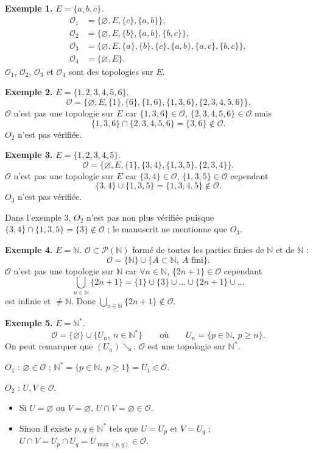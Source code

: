 \documentclass[11pt,a4paper]{article}
\newcommand{\N}{\mathbb{N}}
\newcommand{\Pp}{\mathscr{P}}
\newcommand{\Oo}{\mathscr{O}}
\begin{document}
\textbf{\color{bleu}Exemple 1.} $E=\{a,b,c\}$.
\begin{align*}
  \Oo_1&=\bigl\{\varnothing,E,\{c\},\{a,b\}\bigr\},\\
  \Oo_2&=\bigl\{\varnothing,E,\{b\},\{a,b\},\{b,c\}\bigr\},\\
  \Oo_3&=\bigl\{\varnothing,E,\{a\},\{b\},\{c\},\{a,b\},\{a,c\},\{b,c\}\bigr\},\\
  \Oo_4&=\bigl\{\varnothing,E\bigr\}.
\end{align*}
$\Oo_1$, $\Oo_2$, $\Oo_3$ et $\Oo_4$ sont des topologies sur $E$.

\textbf{\color{bleu}Exemple 2.} $E=\{1,2,3,4,5,6\}$.
\[
  \Oo=\bigl\{\varnothing,E,\{1\},\{6\},\{1,6\},\{1,3,6\},\{2,3,4,5,6\}\bigr\}.
\]
$\Oo$ n'est pas une topologie sur $E$ car $\{1,3,6\}\in\Oo$, $\{2,3,4,5,6\}\in\Oo$ mais
\[
  \{1,3,6\}\cap\{2,3,4,5,6\}=\{3,6\}\notin\Oo .
\]
$O_2$ n'est pas vérifiée.

\textbf{\color{bleu}Exemple 3.} $E=\{1,2,3,4,5\}$.
\[
  \Oo=\bigl\{\varnothing,E,\{1\},\{3,4\},\{1,3,5\},\{2,3,4\}\bigr\}.
\]
$\Oo$ n'est pas une topologie sur $E$ car $\{3,4\}\in\Oo$, $\{1,3,5\}\in\Oo$ cependant
\[
  \{3,4\}\cup\{1,3,5\}=\{1,3,4,5\}\notin\Oo .
\]
$O_3$ n'est pas vérifiée.

\begin{note}
Dans l'exemple 3, $O_2$ n'est pas non plus vérifiée puisque $\{3,4\}\cap\{1,3,5\}=\{3\}\notin\Oo$ ; le manuscrit ne mentionne que $O_3$.
\end{note}

\textbf{\color{bleu}Exemple 4.} $E=\N$.
$\Oo\subset\Pp(\N)$ formé de toutes les parties finies de $\N$ et de $\N$ :
\[
  \Oo=\{\N\}\cup\{A\subset\N,\ A\text{ fini}\}.
\]
$\Oo$ n'est pas une topologie sur $\N$ car $\forall n\in\N$, $\{2n+1\}\in\Oo$ cependant
\[
  \bigcup_{n\in\N}\{2n+1\}=\{1\}\cup\{3\}\cup\dots\cup\{2n+1\}\cup\dots
\]
est infinie et $\neq\N$. Donc $\displaystyle\bigcup_{n\in\N}\{2n+1\}\notin\Oo$.

\textbf{\color{bleu}Exemple 5.} $E=\N^*$.
\[
  \Oo=\{\varnothing\}\cup\{U_n,\ n\in\N^*\}\qquad\text{où}\qquad U_n=\{p\in\N,\ p\ge n\}.
\]
On peut remarquer que $(U_n)\searrow$. $\Oo$ est une topologie sur $\N^*$.

$O_1$ : $\varnothing\in\Oo$ ; $\N^*=\{p\in\N,\ p\ge1\}=U_1\in\Oo$.

$O_2$ : $U,V\in\Oo$.
\begin{itemize}
  \item Si $U=\varnothing$ ou $V=\varnothing$, $U\cap V=\varnothing\in\Oo$.
  \item Sinon il existe $p,q\in\N^*$ tels que $U=U_p$ et $V=U_q$ ; $U\cap V=U_p\cap U_q=U_{\max(p,q)}\in\Oo$.
\end{itemize}
\end{document}
